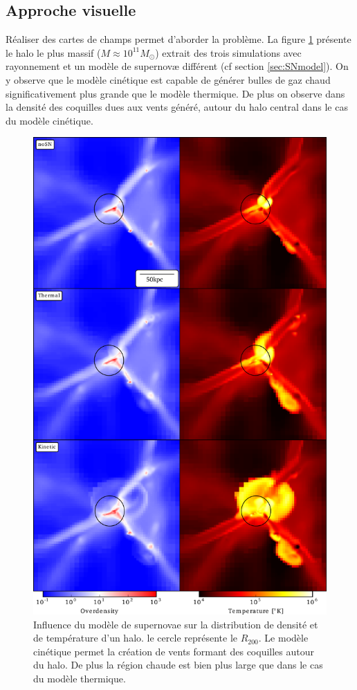\subsection{Approche visuelle}

Réaliser des cartes de champs permet d'aborder la problème.
La figure \ref{fig:halo} présente le halo le plus massif ($M\approx10^{11} M_\odot$) extrait des trois simulations avec rayonnement et un modèle de supernovæ différent (cf section \ref{sec:SNmodel}).
On y observe que le modèle cinétique est capable de générer bulles de gaz chaud significativement plus grande que le modèle thermique.
De plus on observe dans la densité des coquilles dues aux vents généré, autour du halo central dans le cas du modèle cinétique.

\begin{figure}
		\includegraphics[width=.95\linewidth]{img/03/halos.pdf}
        \caption[Influence du modèle de supernovae sur la forme des halos]{Influence du modèle de supernovae sur la distribution de densité et de température d'un halo.
        le cercle représente le $R_{200}$.
        Le modèle cinétique permet la création de vents formant des coquilles autour du halo.
        De plus la région chaude est bien plus large que dans le cas du modèle thermique.
 		\label{fig:halo}}
\end{figure}


